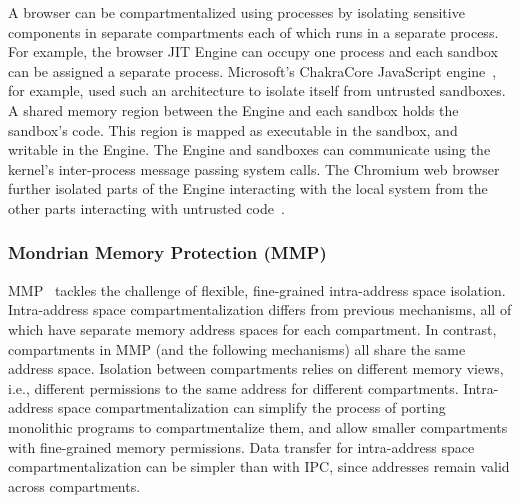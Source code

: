 A browser can be compartmentalized using processes by isolating sensitive
components in separate compartments each of which runs in a separate process.
For example, the browser JIT Engine can occupy one process and each sandbox
can be assigned a separate process.
Microsoft's ChakraCore JavaScript engine~\cite{ChakraCore}, for example, 
used such an architecture to isolate itself from untrusted sandboxes.
A shared memory region between the Engine and each sandbox holds the sandbox's
code.
This region is mapped as executable in the sandbox, and writable in the Engine.
The Engine and sandboxes can communicate using the kernel's inter-process 
message passing system calls.
The Chromium web browser further isolated parts of the Engine interacting with
the local system from the other parts interacting with untrusted 
code~\cite{barth2008security}.

\subsubsection{Mondrian Memory Protection (MMP)}
MMP~\cite{WitchelCA02MMP} tackles the challenge of flexible, 
fine-grained intra-address space isolation.
Intra-address space compartmentalization differs from previous mechanisms,
all of which have separate memory address spaces for each compartment.
In contrast, compartments in MMP (and the following mechanisms) all share the
same address space.
Isolation between compartments relies on different 
memory views, i.e., different permissions to the same address for 
different compartments.
Intra-address space compartmentalization can simplify the process of
porting monolithic programs to compartmentalize them, and allow
smaller compartments with fine-grained memory permissions.
Data transfer for intra-address space compartmentalization can be simpler
than with IPC, since addresses remain valid across compartments.

